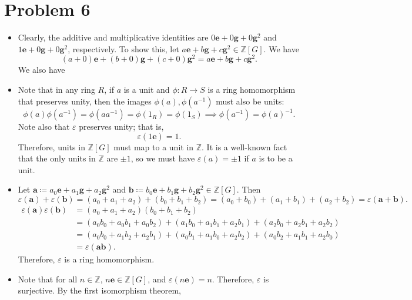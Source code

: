 \documentclass[11pt, letterpaper]{article}
\begin{document}
\section*{Problem 6}
\begin{itemize}
	\item Clearly, the additive and multiplicative identities are $0 \mathbf{e} +0 \mathbf{g} +0 \mathbf{g} ^2$ and $1 \mathbf{e} +0 \mathbf{g} +0 \mathbf{g} ^2$, respectively. To show this, let $a \mathbf{e} +b \mathbf{g} +c \mathbf{g} ^2\in\mathbb{Z} [G]$. We have
		\[
			(a+0)\mathbf{e} +(b+0)\mathbf{g} +(c+0)\mathbf{g} ^2=a \mathbf{e} +b \mathbf{g} +c \mathbf{g} ^2
		.\]
		We also have 
	\item Note that in any ring $R$, if $a$ is a unit and $\phi : R \to S$ is a ring homomorphism that preserves unity, then the images $\phi (a),\phi (a^{-1} )$ must also be units:
		\[
			\phi (a)\phi \left( a^{-1}  \right) =\phi \left( aa^{-1}  \right) =\phi (1_R)=\phi (1_S)\implies \phi \left( a^{-1}  \right) =\phi (a)^{-1} 
		.\]
	Note also that $\varepsilon $ preserves unity; that is,
		\[
			\varepsilon (1 \mathbf{e} )=1
		.\]
		Therefore, units in $\mathbb{Z} [G]$ must map to a unit in $\mathbb{Z} $. It is a well-known fact that the only units in $\mathbb{Z} $ are $\pm1$, so we must have $\varepsilon (a)=\pm 1$ if $a$ is to be a unit.
	\item Let $\mathbf{a} \coloneqq a_0 \mathbf{e} +a_1 \mathbf{g} +a_2 \mathbf{g}^2$ and $\mathbf{b} \coloneqq b_0 \mathbf{e} +b_1 \mathbf{g} +b_2 \mathbf{g} ^2\in \mathbb{Z} [G]$. Then
		\[
			\varepsilon (\mathbf{a} )+\varepsilon (\mathbf{b} )=\left( a_0+a_1+a_2 \right) +(b_0+b_1+b_2)=(a_0+b_0)+(a_1+b_1)+(a_2+b_2)=\varepsilon (\mathbf{a} +\mathbf{b} )
		.\]
		\begin{align*}
			\varepsilon (\mathbf{a} )\varepsilon (\mathbf{b} )&=\left( a_0+a_1+a_2 \right) \left( b_0+b_1+b_2 \right) \\
									  &=(a_0b_0+a_0b_1+a_0b_2)+(a_1b_0+a_1b_1+a_2b_1)+(a_2b_0+a_2b_1+a_2b_2)\\
									  &=(a_0b_0+a_1b_2+a_2b_1)+(a_0b_1+a_1b_0+a_2b_2)+(a_0b_2+a_1b_1+a_2b_0)\\
									  &=\varepsilon (\mathbf{a} \mathbf{b} )
		.\end{align*}
		Therefore, $\varepsilon $ is a ring homomorphism.
	\item Note that for all $n\in\mathbb{Z} $, $n \mathbf{e} \in \mathbb{Z} [G]$, and $\varepsilon (n \mathbf{e} )=n$. Therefore, $\varepsilon $ is surjective. By the first isomorphism theorem,

\end{itemize}
\end{document}

